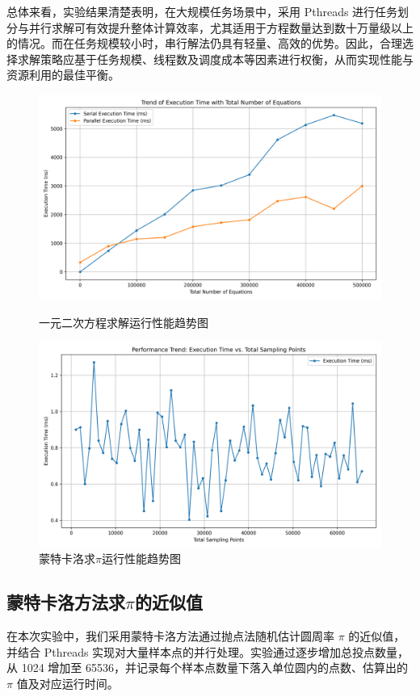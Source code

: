\documentclass[a4paper, utf8]{ctexart}
\begin{document}
	总体来看，实验结果清楚表明，在大规模任务场景中，采用 Pthreads 进行任务划分与并行求解可有效提升整体计算效率，尤其适用于方程数量达到数十万量级以上的情况。而在任务规模较小时，串行解法仍具有轻量、高效的优势。因此，合理选择求解策略应基于任务规模、线程数及调度成本等因素进行权衡，从而实现性能与资源利用的最佳平衡。
	
	\begin{figure}
		\centering
		\begin{minipage}{.45\textwidth}
			\centering
			\includegraphics[width=.8\textwidth]{./figure/time_trend.png}
			\caption{一元二次方程求解运行性能趋势图}
		\end{minipage}
		\begin{minipage}{.45\textwidth}
			\centering
			\includegraphics[width=.8\textwidth]{./figure/performance_trend.png}
			\caption{蒙特卡洛求$\pi$运行性能趋势图}
		\end{minipage}
	\end{figure}
	
	\subsection{蒙特卡洛方法求$\pi$的近似值}
	
	在本次实验中，我们采用蒙特卡洛方法通过抛点法随机估计圆周率 $\pi$ 的近似值，并结合 Pthreads 实现对大量样本点的并行处理。实验通过逐步增加总投点数量，从 1024 增加至 65536，并记录每个样本点数量下落入单位圆内的点数、估算出的 $\pi$ 值及对应运行时间。
	
\end{document}
